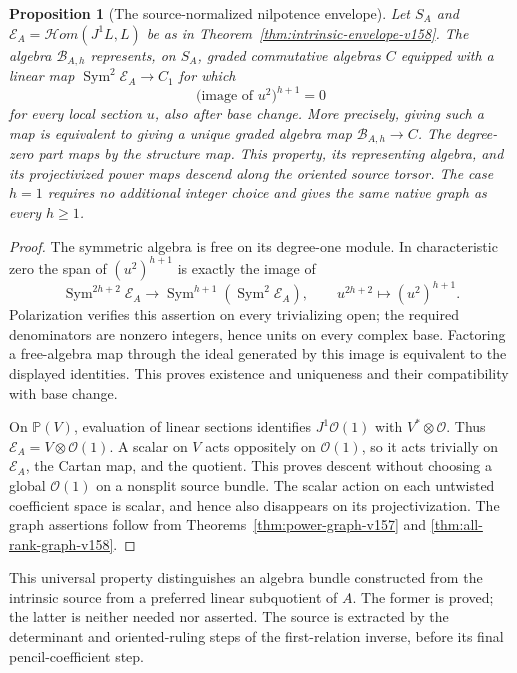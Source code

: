 \documentclass[11pt,reqno]{amsart}
\numberwithin{equation}{section}
\newtheorem{proposition}[theorem]{Proposition}
\theoremstyle{definition}\newtheorem{definition}[theorem]{Definition}
\theoremstyle{remark}\newtheorem{remark}[theorem]{Remark}
\newcommand{\Pj}{\mathbb P}\newcommand{\A}{\mathbb A}
\newcommand{\OO}{\mathcal O}\newcommand{\II}{\mathcal I}
\DeclareMathOperator{\Sym}{Sym}\DeclareMathOperator{\Gr}{Gr}
\begin{document}
\begin{proposition}[The source-normalized nilpotence envelope]
\label{prop:universal-envelope-v159}
Let $S_A$ and $\mathscr E_A=\mathcal Hom(J^1L,L)$ be as in
Theorem~\ref{thm:intrinsic-envelope-v158}. The algebra
$\mathscr B_{A,h}$ represents, on $S_A$, graded commutative algebras
$C$ equipped with a linear map $\Sym^2\mathscr E_A\to C_1$ for which
\[
                  \bigl(\text{image of }u^2\bigr)^{h+1}=0
\]
for every local section $u$, also after base change. More precisely,
giving such a map is equivalent to giving a unique graded algebra map
$\mathscr B_{A,h}\to C$. The degree-zero part maps by the structure
map. This property, its representing algebra, and its projectivized
power maps descend along the oriented source torsor. The case $h=1$
requires no additional integer choice and gives the same native graph
as every $h\geq1$.
\end{proposition}
\begin{proof}
The symmetric algebra is free on its degree-one module. In
characteristic zero the span of $(u^2)^{h+1}$ is exactly the image of
\[
 \Sym^{2h+2}\mathscr E_A\longrightarrow
                   \Sym^{h+1}(\Sym^2\mathscr E_A),\qquad
 u^{2h+2}\longmapsto(u^2)^{h+1}.
\]
Polarization verifies this assertion on every trivializing open;
the required denominators are nonzero integers, hence units on every
complex base. Factoring a free-algebra map through the ideal generated
by this image is equivalent to the displayed identities. This proves
existence and uniqueness and their compatibility with base change.

On $\Pj(V)$, evaluation of linear sections identifies
$J^1\OO(1)$ with $V^*\otimes\OO$. Thus
$\mathscr E_A=V\otimes\OO(1)$. A scalar on $V$ acts oppositely on
$\OO(1)$, so it acts trivially on $\mathscr E_A$, the Cartan map,
and the quotient. This proves descent without choosing a global
$\OO(1)$ on a nonsplit source bundle. The scalar action on each
untwisted coefficient space is scalar, and hence also disappears on
its projectivization. The graph assertions follow from
Theorems~\ref{thm:power-graph-v157} and
\ref{thm:all-rank-graph-v158}.
\end{proof}

This universal property distinguishes an algebra bundle constructed
from the intrinsic source from a preferred linear subquotient of $A$.
The former is proved; the latter is neither needed nor asserted.
The source is extracted by the determinant and oriented-ruling steps
of the first-relation inverse, before its final pencil-coefficient step.
\end{document}
